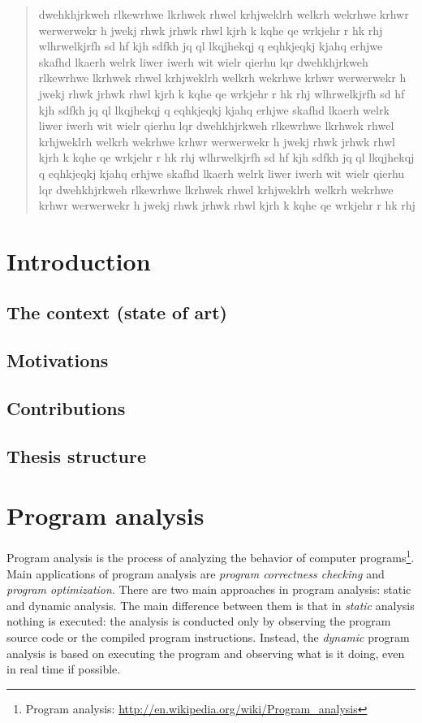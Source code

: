 \documentclass[a4paper,11pt]{report}
\begin{document}
\begin{abstract}
dwehkhjrkweh rlkewrhwe lkrhwek rhwel krhjweklrh welkrh wekrhwe krhwr
werwerwekr h jwekj rhwk jrhwk rhwl kjrh k kqhe qe wrkjehr r hk rhj
wlhrwelkjrfh sd hf kjh sdfkh jq ql lkqjhekqj q eqhkjeqkj kjahq 
erhjwe skafhd lkaerh welrk liwer  iwerh wit wielr qierhu lqr 
dwehkhjrkweh rlkewrhwe lkrhwek rhwel krhjweklrh welkrh wekrhwe krhwr
werwerwekr h jwekj rhwk jrhwk rhwl kjrh k kqhe qe wrkjehr r hk rhj
wlhrwelkjrfh sd hf kjh sdfkh jq ql lkqjhekqj q eqhkjeqkj kjahq 
erhjwe skafhd lkaerh welrk liwer  iwerh wit wielr qierhu lqr 
dwehkhjrkweh rlkewrhwe lkrhwek rhwel krhjweklrh welkrh wekrhwe krhwr
werwerwekr h jwekj rhwk jrhwk rhwl kjrh k kqhe qe wrkjehr r hk rhj
wlhrwelkjrfh sd hf kjh sdfkh jq ql lkqjhekqj q eqhkjeqkj kjahq 
erhjwe skafhd lkaerh welrk liwer  iwerh wit wielr qierhu lqr 
dwehkhjrkweh rlkewrhwe lkrhwek rhwel krhjweklrh welkrh wekrhwe krhwr
werwerwekr h jwekj rhwk jrhwk rhwl kjrh k kqhe qe wrkjehr r hk rhj

\end{abstract}


\tableofcontents

\chapter{Introduction}


\section{The context (state of art)}
\section{Motivations}
\section{Contributions}
\section{Thesis structure}

\chapter{Program analysis}

Program analysis is the process of analyzing the behavior of computer programs\footnote{Program analysis: \url{http://en.wikipedia.org/wiki/Program_analysis}}. Main applications of program analysis are \emph{program correctness checking} and \emph{program optimization}.
There are two main approaches in program analysis: static and dynamic analysis.
The main difference between them is that in \emph{static} analysis nothing is executed: the analysis
is conducted only by observing the program source code or the compiled program instructions. Instead, the \emph{dynamic} program analysis is based on executing the program and observing what is it doing, even in real time if possible.
\end{document}

